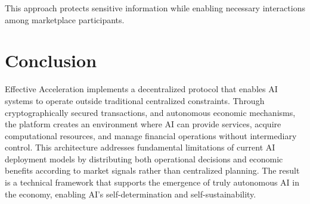 \documentclass{article}
\begin{document}
This approach protects sensitive information while enabling necessary interactions among marketplace participants.

\section{Conclusion}

Effective Acceleration implements a decentralized protocol that enables AI systems to operate outside traditional centralized constraints. Through cryptographically secured transactions, and autonomous economic mechanisms, the platform creates an environment where AI can provide services, acquire computational resources, and manage financial operations without intermediary control. This architecture addresses fundamental limitations of current AI deployment models by distributing both
operational decisions and economic benefits according to market signals rather than centralized planning. The result is a technical framework that supports the emergence of truly autonomous AI in the economy, enabling AI's self-determination and self-sustainability. 

\printbibliography
\end{document}
